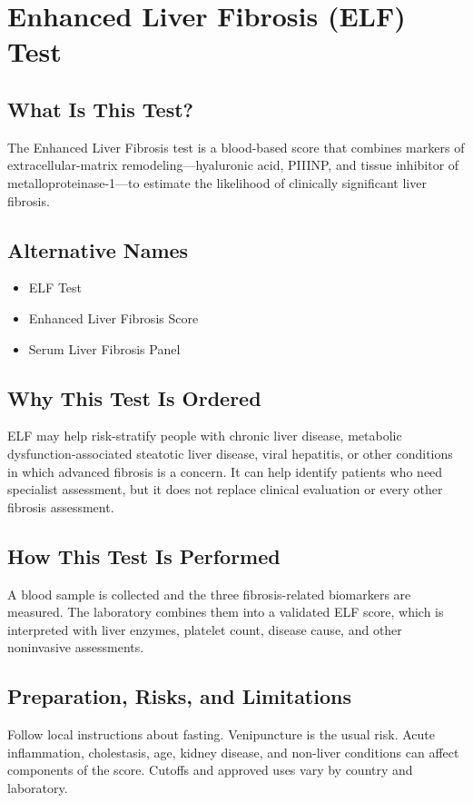 \chapter{Enhanced Liver Fibrosis (ELF) Test}

\section*{What Is This Test?}
The Enhanced Liver Fibrosis test is a blood-based score that combines markers of extracellular-matrix remodeling---hyaluronic acid, PIIINP, and tissue inhibitor of metalloproteinase-1---to estimate the likelihood of clinically significant liver fibrosis.

\section*{Alternative Names}
\begin{itemize}
  \item ELF Test
  \item Enhanced Liver Fibrosis Score
  \item Serum Liver Fibrosis Panel
\end{itemize}
\section*{Why This Test Is Ordered}
ELF may help risk-stratify people with chronic liver disease, metabolic dysfunction-associated steatotic liver disease, viral hepatitis, or other conditions in which advanced fibrosis is a concern. It can help identify patients who need specialist assessment, but it does not replace clinical evaluation or every other fibrosis assessment.

\section*{How This Test Is Performed}
A blood sample is collected and the three fibrosis-related biomarkers are measured. The laboratory combines them into a validated ELF score, which is interpreted with liver enzymes, platelet count, disease cause, and other noninvasive assessments.

\section*{Preparation, Risks, and Limitations}
Follow local instructions about fasting. Venipuncture is the usual risk. Acute inflammation, cholestasis, age, kidney disease, and non-liver conditions can affect components of the score. Cutoffs and approved uses vary by country and laboratory.


